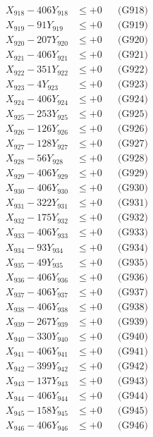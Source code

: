 \documentclass[a4paper,10pt]{article}
\begin{document}
{\begin{align}
X_{918} - 406Y_{918} &\leq +0 && \text{(G918)} \\
X_{919} - 91Y_{919} &\leq +0 && \text{(G919)} \\
X_{920} - 207Y_{920} &\leq +0 && \text{(G920)} \\
\allowbreak
X_{921} - 406Y_{921} &\leq +0 && \text{(G921)} \\
X_{922} - 351Y_{922} &\leq +0 && \text{(G922)} \\
X_{923} - 4Y_{923} &\leq +0 && \text{(G923)} \\
X_{924} - 406Y_{924} &\leq +0 && \text{(G924)} \\
X_{925} - 253Y_{925} &\leq +0 && \text{(G925)} \\
X_{926} - 126Y_{926} &\leq +0 && \text{(G926)} \\
X_{927} - 128Y_{927} &\leq +0 && \text{(G927)} \\
X_{928} - 56Y_{928} &\leq +0 && \text{(G928)} \\
X_{929} - 406Y_{929} &\leq +0 && \text{(G929)} \\
X_{930} - 406Y_{930} &\leq +0 && \text{(G930)} \\
\allowbreak
X_{931} - 322Y_{931} &\leq +0 && \text{(G931)} \\
X_{932} - 175Y_{932} &\leq +0 && \text{(G932)} \\
X_{933} - 406Y_{933} &\leq +0 && \text{(G933)} \\
X_{934} - 93Y_{934} &\leq +0 && \text{(G934)} \\
X_{935} - 49Y_{935} &\leq +0 && \text{(G935)} \\
X_{936} - 406Y_{936} &\leq +0 && \text{(G936)} \\
X_{937} - 406Y_{937} &\leq +0 && \text{(G937)} \\
X_{938} - 406Y_{938} &\leq +0 && \text{(G938)} \\
X_{939} - 267Y_{939} &\leq +0 && \text{(G939)} \\
X_{940} - 330Y_{940} &\leq +0 && \text{(G940)} \\
\allowbreak
X_{941} - 406Y_{941} &\leq +0 && \text{(G941)} \\
X_{942} - 399Y_{942} &\leq +0 && \text{(G942)} \\
X_{943} - 137Y_{943} &\leq +0 && \text{(G943)} \\
X_{944} - 406Y_{944} &\leq +0 && \text{(G944)} \\
X_{945} - 158Y_{945} &\leq +0 && \text{(G945)} \\
X_{946} - 406Y_{946} &\leq +0 && \text{(G946)} \\

\end{align}}
\end{document}
